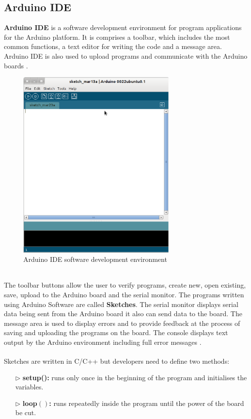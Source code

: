 \documentclass[12pt,a4paper]{report}
\begin{document}
\subsection{Arduino IDE}
\textbf{Arduino IDE} is a software development environment for program applications for the Arduino platform. It is comprises a toolbar, which includes the most common functions, a text editor for writing the code and a message area. Arduino IDE is also used to upload programs and communicate with the Arduino boards \cite{website:arduinosoftware}.
\begin{figure}[H]
    \centering
    \includegraphics*[width=300px]{arduinomain}
    \caption{Arduino IDE software development environment}
\end{figure}
\ \\
The toolbar buttons allow the user to verify programs, create new, open existing, save, upload to the Arduino board and the serial monitor. The programs written using Arduino Software are called \textbf{Sketches}. The serial monitor displays serial data being sent from the Arduino board it also can send data to the board. The message area is used to display errors and to provide feedback at the process of saving and uploading the programs on the board. The console displays text output by the Arduino environment including full error messages \cite{website:arduinosoftware}.\\
\ \\
Sketches are written in C/C++ but developers need to define two methods:
\begin{itemize}
    \item[$\triangleright$] \textbf{setup():} runs only once in the beginning of the program and initialises the variables.
    \item[$\triangleright$] \textbf{loop$()$:} runs repeatedly inside the program until the power of the board be cut.   
\end{itemize}
\end{document}
